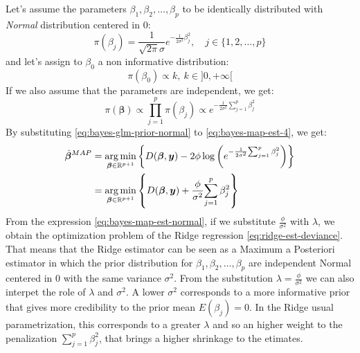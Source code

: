 \documentclass[a4paper, nobind]{templates/ociamthesis}
\theoremstyle{definition}
\theoremstyle{definition}
\theoremstyle{definition}
\theoremstyle{remark}
\begin{document}
Let's assume the parameters \(\beta_1, \beta_2, \dots, \beta_p\) to be identically distributed with \emph{Normal} distribution centered in \(0\):
\[
\pi(\beta_j) = \frac{1}{\sqrt{2\pi}\sigma}e^{-\frac{1}{2\sigma^2}\beta_j^2}, \quad j\in\{1,2,\dots,p\}
\]
and let's assign to \(\beta_0\) a non informative distribution:
\[
\pi(\beta_0) \propto k, \ k\in]0,+\infty[
\]
If we also assume that the parameters are independent, we get:
\begin{equation}
\label{eq:bayes-glm-prior-normal}
\pi(\boldsymbol{\beta}) \propto \prod_{j=1}^{p}{\pi(\beta_j)} \propto e^{-\frac{1}{2\sigma^2}{\sum_{j=1}^{p}{\beta_j^2}}} 
\end{equation}
By substituting \eqref{eq:bayes-glm-prior-normal} to \eqref{eq:bayes-map-est-4}, we get:
\begin{align}
\nonumber
\hat{\boldsymbol{\beta}}^{MAP} & =
\operatorname*{arg\,min}_{\boldsymbol{\beta}\in\mathbb{R}^{p+1}}{\left\{
D(\boldsymbol{\beta}, \boldsymbol{y}) -2\phi \log{\left(e^{-\frac{1}{2\sigma^2}{\sum_{j=1}^{p}{\beta_j^2}}}\right)} \right\}} \\
\label{eq:bayes-map-est-normal}
& = \operatorname*{arg\,min}_{\boldsymbol{\beta}\in\mathbb{R}^{p+1}}{\left\{
D(\boldsymbol{\beta}, \boldsymbol{y}) + \frac{\phi}{\sigma^2} {\sum_{j=1}^{p}{\beta_j^2}}\right\}}
\end{align}
From the expression \eqref{eq:bayes-map-est-normal}, if we substitute \(\frac{\phi}{\sigma^2}\) with \(\lambda\), we obtain the optimization problem of the Ridge regression \eqref{eq:ridge-est-deviance}. That means that the Ridge estimator can be seen as a Maximum a Posteriori estimator in which the prior distribution for \(\beta_1, \beta_2, \dots, \beta_p\) are independent Normal centered in \(0\) with the same variance \(\sigma^2\). From the substitution \(\lambda=\frac{\phi}{\sigma^2}\) we can also interpet the role of \(\lambda\) and \(\sigma^2\). A lower \(\sigma^2\) corresponds to a more informative prior that gives more credibility to the prior mean \(E(\beta_j)=0\). In the Ridge usual parametrization, this corresponds to a greater \(\lambda\) and so an higher weight to the penalization \(\sum_{j=1}^{p}{\beta_j^2}\), that brings a higher shrinkage to the etimates.
\end{document}
